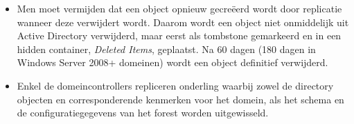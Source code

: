 \begin{enumerate}
{\begin{itemize}
				\item Men moet vermijden dat een object opnieuw gecreëerd wordt door replicatie wanneer deze verwijdert wordt. Daarom wordt een object niet onmiddelijk uit Active Directory verwijderd, maar eerst als tombstone gemarkeerd en in een hidden container, \textit{Deleted Items}, geplaatst. Na 60 dagen (180 dagen in Windows Server 2008+ domeinen) wordt een object definitief verwijderd. 
			\end{itemize}
		}
		
		 {
			\begin{itemize}
				\item Enkel de domeincontrollers repliceren onderling waarbij zowel de directory objecten en corresponderende kenmerken voor het domein, als het schema en de configuratiegegevens van het forest worden uitgewisseld.
			\end{itemize}

		}
		

\end{enumerate}
